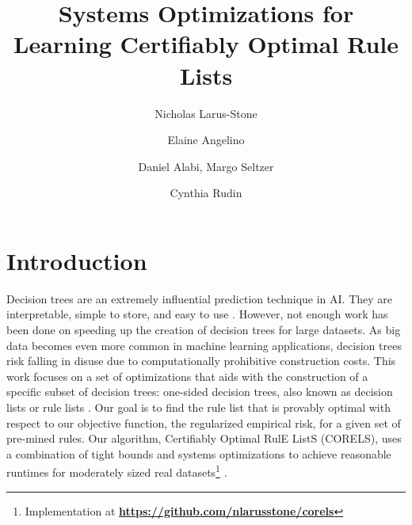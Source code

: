 \documentclass[format=sigconf]{acmart}
\begin{document}
\title{Systems Optimizations for Learning Certifiably Optimal Rule Lists}
\author{Nicholas Larus-Stone}

\author{Elaine Angelino}

\author{Daniel Alabi, Margo Seltzer}

\author{Cynthia Rudin}

\maketitle

\setlength{\abovedisplayskip}{3pt}
\setlength{\belowdisplayskip}{3pt}
\setlength{\belowcaptionskip}{-10pt}

\section{Introduction}
Decision trees are an extremely influential prediction technique in AI.
They are interpretable, simple to store, and easy to use \cite{BreimanFrOlSt84}.
However, not enough work has been done on speeding up the creation of decision trees for large datasets.
As big data becomes even more common in machine learning applications, decision trees risk falling in disuse due to computationally prohibitive construction costs.
This work focuses on a set of optimizations that aids with the construction of a specific subset of decision trees: one-sided decision trees, also known as decision lists or rule lists \cite{Rivest87}.
Our goal is to find the rule list that is provably optimal with respect to our objective function, the regularized empirical risk, for a given set of pre-mined rules.
Our algorithm, Certifiably Optimal RulE ListS (CORELS), uses a combination of tight bounds and systems optimizations to achieve reasonable runtimes for moderately sized real datasets\footnote{Implementation at \textbf{\url{https://github.com/nlarusstone/corels}}} \citep{AngelinoLaAlSeRu17-kdd, AngelinoLaAlSeRu17}.
\end{document}
